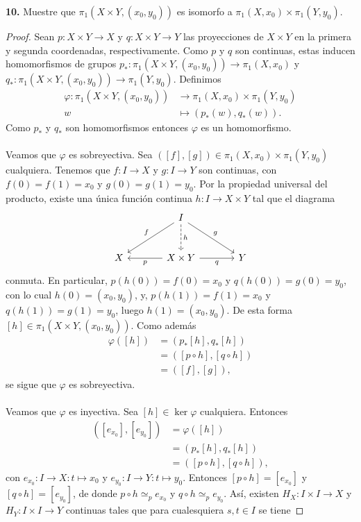 \textbf{10.} Muestre que $\pi_1(X\times Y,(x_0,y_0))$ es isomorfo a $\pi_1(X,x_0)\times\pi_1(Y,y_0)$.
\begin{proof}
Sean $p:X\times Y\to X$ y $q:X\times Y\to Y$ las proyecciones de $X\times Y$ en la primera y segunda coordenadas, respectivamente. Como $p$ y $q$ son continuas, estas inducen homomorfismos de grupos $p_*:\pi_1(X\times Y,(x_0,y_0))\to\pi_1(X,x_0)$ y $q_*:\pi_1(X\times Y,(x_0,y_0))\to\pi_1(Y,y_0)$. Definimos
\begin{align*}
\varphi:\pi_1(X\times Y,(x_0,y_0))&\to\pi_1(X,x_0)\times\pi_1(Y,y_0)\\
w&\mapsto(p_*(w),q_*(w)).
\end{align*}
Como $p_*$ y $q_*$ son homomorfismos entonces $\varphi$ es un homomorfismo.\\\\
Veamos que $\varphi$ es sobreyectiva. Sea $([f],[g])\in\pi_1(X,x_0)\times\pi_1(Y,y_0)$ cualquiera. Tenemos que $f:I\to X$ y $g:I\to Y$ son continuas, con $f(0)=f(1)=x_0$ y $g(0)=g(1)=y_0$. Por la propiedad universal del producto, existe una única función continua $h:I\to X\times Y$ tal que el diagrama
\[
\begin{tikzcd}[column sep=large,row sep=large]
 & I \arrow[dl,"f"'] \arrow[dr,"g"] \arrow[d,dashed,"h"] & \\
X & X\times Y \arrow[l,"p"] \arrow[r,"q"'] & Y
\end{tikzcd}
\]
conmuta. En particular, $p(h(0))=f(0)=x_0$ y $q(h(0))=g(0)=y_0$, con lo cual $h(0)=(x_0,y_0)$, y, $p(h(1))=f(1)=x_0$ y $q(h(1))=g(1)=y_0$, luego $h(1)=(x_0,y_0)$. De esta forma $[h]\in\pi_1(X\times Y,(x_0,y_0))$. Como además
\begin{align*}
\varphi([h])&=(p_*[h],q_*[h])\\
&=([p\circ h],[q\circ h])\\
&=([f],[g]),
\end{align*}
se sigue que $\varphi$ es sobreyectiva.\\\\
Veamos que $\varphi$ es inyectiva. Sea $[h]\in\ker\varphi$ cualquiera. Entonces
\begin{align*}
([e_{x_0}],[e_{y_0}])&=\varphi([h])\\
&=(p_*[h],q_*[h])\\
&=([p\circ h],[q\circ h]),
\end{align*}
con $e_{x_0}:I\to X:t\mapsto x_0$ y $e_{y_0}:I\to Y:t\mapsto y_0$. Entonces $[p\circ h]=[e_{x_0}]$ y $[q\circ h]=[e_{y_0}]$, de donde $p\circ h\simeq_p e_{x_0}$ y $q\circ h\simeq_p e_{y_0}$. Así, existen $H_X:I\times I\to X$ y $H_Y:I\times I\to Y$ continuas tales que para cualesquiera $s,t\in I$ se tiene

\end{proof}
